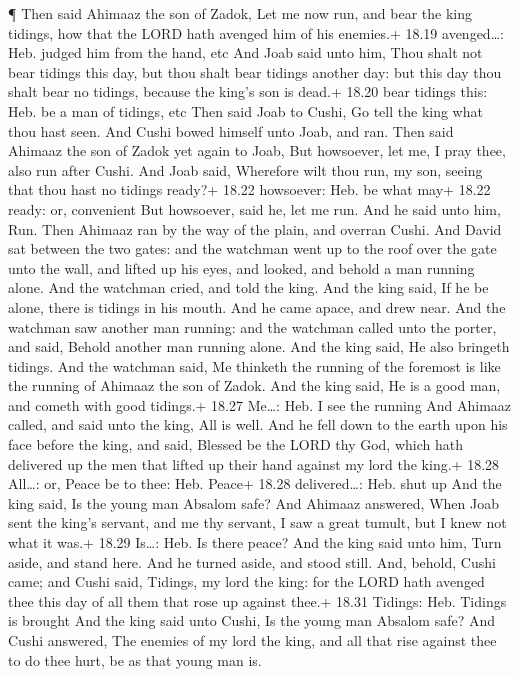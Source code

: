  ¶ Then said Ahimaaz the son of Zadok, Let me now run, and
bear the king tidings, how that the LORD hath avenged him of his
enemies.+ 18.19 avenged\ldots: Heb. judged him from the hand, etc
 And Joab said unto him, Thou shalt not bear tidings this
day, but thou shalt bear tidings another day: but this day thou shalt
bear no tidings, because the king's son is dead.+ 18.20 bear tidings
this: Heb. be a man of tidings, etc  Then said Joab to
Cushi, Go tell the king what thou hast seen. And Cushi bowed himself
unto Joab, and ran.  Then said Ahimaaz the son of Zadok yet
again to Joab, But howsoever, let me, I pray thee, also run after Cushi.
And Joab said, Wherefore wilt thou run, my son, seeing that thou hast no
tidings ready?+ 18.22 howsoever: Heb. be what may+ 18.22 ready: or,
convenient  But howsoever, said he, let me run. And he said
unto him, Run. Then Ahimaaz ran by the way of the plain, and overran
Cushi.  And David sat between the two gates: and the
watchman went up to the roof over the gate unto the wall, and lifted up
his eyes, and looked, and behold a man running alone.  And
the watchman cried, and told the king. And the king said, If he be
alone, there is tidings in his mouth. And he came apace, and drew near.
 And the watchman saw another man running: and the watchman
called unto the porter, and said, Behold another man running alone. And
the king said, He also bringeth tidings.  And the watchman
said, Me thinketh the running of the foremost is like the running of
Ahimaaz the son of Zadok. And the king said, He is a good man, and
cometh with good tidings.+ 18.27 Me\ldots: Heb. I see the running
 And Ahimaaz called, and said unto the king, All is well.
And he fell down to the earth upon his face before the king, and said,
Blessed be the LORD thy God, which hath delivered up the men that lifted
up their hand against my lord the king.+ 18.28 All\ldots: or, Peace be
to thee: Heb. Peace+ 18.28 delivered\ldots: Heb. shut up 
And the king said, Is the young man Absalom safe? And Ahimaaz answered,
When Joab sent the king's servant, and me thy servant, I saw a great
tumult, but I knew not what it was.+ 18.29 Is\ldots: Heb. Is there
peace?  And the king said unto him, Turn aside, and stand
here. And he turned aside, and stood still.  And, behold,
Cushi came; and Cushi said, Tidings, my lord the king: for the LORD hath
avenged thee this day of all them that rose up against thee.+ 18.31
Tidings: Heb. Tidings is brought  And the king said unto
Cushi, Is the young man Absalom safe? And Cushi answered, The enemies of
my lord the king, and all that rise against thee to do thee hurt, be as
that young man is.

